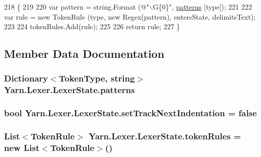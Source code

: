 \begin{DoxyCode}
218                                                                                                            
            \{
219 
220                 var pattern = string.Format (\textcolor{stringliteral}{@"\(\backslash\)G\{0\}"}, \hyperlink{a00048_a951f91e9522ffe84851f2e25e9445106}{patterns} [type]);
221 
222                 var rule = \textcolor{keyword}{new} TokenRule (type, \textcolor{keyword}{new} Regex(pattern), entersState, delimitsText);
223 
224                 tokenRules.Add(rule);
225 
226                 \textcolor{keywordflow}{return} rule;
227             \}
\end{DoxyCode}


\subsection{Member Data Documentation}
\hypertarget{a00048_a951f91e9522ffe84851f2e25e9445106}{
\subsubsection[{patterns}]{\setlength{\rightskip}{0pt plus 5cm}Dictionary$<${\bf Token\-Type}, string$>$ Yarn.\-Lexer.\-Lexer\-State.\-patterns\hspace{0.3cm}{\ttfamily [private]}}}\label{a00048_a951f91e9522ffe84851f2e25e9445106}
\hypertarget{a00048_ad8b6ccac53bedd9dc202ffe6ac5698b2}{
\subsubsection[{set\-Track\-Next\-Indentation}]{\setlength{\rightskip}{0pt plus 5cm}bool Yarn.\-Lexer.\-Lexer\-State.\-set\-Track\-Next\-Indentation = false}}\label{a00048_ad8b6ccac53bedd9dc202ffe6ac5698b2}
\hypertarget{a00048_adf6563b1dc6f3ef80ed13c2b15b7be03}{
\subsubsection[{token\-Rules}]{\setlength{\rightskip}{0pt plus 5cm}List$<${\bf Token\-Rule}$>$ Yarn.\-Lexer.\-Lexer\-State.\-token\-Rules = new List$<${\bf Token\-Rule}$>$()}}\label{a00048_adf6563b1dc6f3ef80ed13c2b15b7be03}


